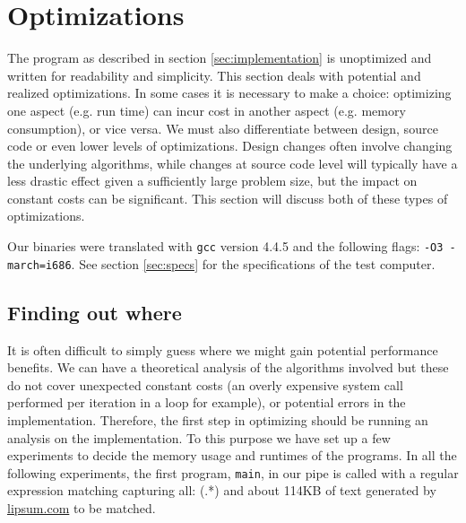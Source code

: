 \section{Optimizations}
\label{sec:optimizations}
The program as described in section \vref{sec:implementation} is
unoptimized and written for readability and simplicity. This section
deals with potential and realized optimizations. In some cases it is
necessary to make a choice: optimizing one aspect (e.g. run time) can
incur cost in another aspect (e.g. memory consumption), or vice versa.
We must also differentiate between design, source code or even lower
levels of optimizations. Design changes often involve changing the
underlying algorithms, while changes at source code level will
typically have a less drastic effect given a sufficiently large
problem size, but the impact on constant costs can be
significant. This section will discuss both of these types of
optimizations.

Our binaries were translated with \texttt{gcc} version 4.4.5 and the
following flags: \texttt{-O3 -march=i686}. See section
\vref{sec:specs} for the specifications of the test computer.

\subsection{Finding out where}
\label{sec:finding_out_where}
It is often difficult to simply guess where we might gain potential
performance benefits. We can have a theoretical analysis of the
algorithms involved but these do not cover unexpected constant costs
(an overly expensive system call performed per iteration in a loop for
example), or potential errors in the implementation.  Therefore, the
first step in optimizing should be running an analysis on the
implementation. To this purpose we have set up a few experiments to
decide the memory usage and runtimes of the programs. In all the
following experiments, the first program, \texttt{main}, in our pipe
is called with a regular expression matching capturing all:
\textsf{(.*)} and about 114KB of text generated by \url{lipsum.com} to
be matched.


